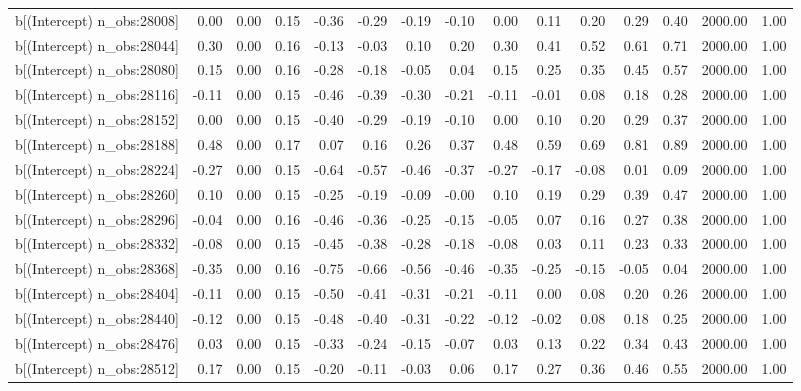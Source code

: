 \begin{table}[ht]
\begin{tabular}{rrrrrrrrrrrrrrr}
  b[(Intercept) n\_obs:28008] & 0.00 & 0.00 & 0.15 & -0.36 & -0.29 & -0.19 & -0.10 & 0.00 & 0.11 & 0.20 & 0.29 & 0.40 & 2000.00 & 1.00 \\ 
  b[(Intercept) n\_obs:28044] & 0.30 & 0.00 & 0.16 & -0.13 & -0.03 & 0.10 & 0.20 & 0.30 & 0.41 & 0.52 & 0.61 & 0.71 & 2000.00 & 1.00 \\ 
  b[(Intercept) n\_obs:28080] & 0.15 & 0.00 & 0.16 & -0.28 & -0.18 & -0.05 & 0.04 & 0.15 & 0.25 & 0.35 & 0.45 & 0.57 & 2000.00 & 1.00 \\ 
  b[(Intercept) n\_obs:28116] & -0.11 & 0.00 & 0.15 & -0.46 & -0.39 & -0.30 & -0.21 & -0.11 & -0.01 & 0.08 & 0.18 & 0.28 & 2000.00 & 1.00 \\ 
  b[(Intercept) n\_obs:28152] & 0.00 & 0.00 & 0.15 & -0.40 & -0.29 & -0.19 & -0.10 & 0.00 & 0.10 & 0.20 & 0.29 & 0.37 & 2000.00 & 1.00 \\ 
  b[(Intercept) n\_obs:28188] & 0.48 & 0.00 & 0.17 & 0.07 & 0.16 & 0.26 & 0.37 & 0.48 & 0.59 & 0.69 & 0.81 & 0.89 & 2000.00 & 1.00 \\ 
  b[(Intercept) n\_obs:28224] & -0.27 & 0.00 & 0.15 & -0.64 & -0.57 & -0.46 & -0.37 & -0.27 & -0.17 & -0.08 & 0.01 & 0.09 & 2000.00 & 1.00 \\ 
  b[(Intercept) n\_obs:28260] & 0.10 & 0.00 & 0.15 & -0.25 & -0.19 & -0.09 & -0.00 & 0.10 & 0.19 & 0.29 & 0.39 & 0.47 & 2000.00 & 1.00 \\ 
  b[(Intercept) n\_obs:28296] & -0.04 & 0.00 & 0.16 & -0.46 & -0.36 & -0.25 & -0.15 & -0.05 & 0.07 & 0.16 & 0.27 & 0.38 & 2000.00 & 1.00 \\ 
  b[(Intercept) n\_obs:28332] & -0.08 & 0.00 & 0.15 & -0.45 & -0.38 & -0.28 & -0.18 & -0.08 & 0.03 & 0.11 & 0.23 & 0.33 & 2000.00 & 1.00 \\ 
  b[(Intercept) n\_obs:28368] & -0.35 & 0.00 & 0.16 & -0.75 & -0.66 & -0.56 & -0.46 & -0.35 & -0.25 & -0.15 & -0.05 & 0.04 & 2000.00 & 1.00 \\ 
  b[(Intercept) n\_obs:28404] & -0.11 & 0.00 & 0.15 & -0.50 & -0.41 & -0.31 & -0.21 & -0.11 & 0.00 & 0.08 & 0.20 & 0.26 & 2000.00 & 1.00 \\ 
  b[(Intercept) n\_obs:28440] & -0.12 & 0.00 & 0.15 & -0.48 & -0.40 & -0.31 & -0.22 & -0.12 & -0.02 & 0.08 & 0.18 & 0.25 & 2000.00 & 1.00 \\ 
  b[(Intercept) n\_obs:28476] & 0.03 & 0.00 & 0.15 & -0.33 & -0.24 & -0.15 & -0.07 & 0.03 & 0.13 & 0.22 & 0.34 & 0.43 & 2000.00 & 1.00 \\ 
  b[(Intercept) n\_obs:28512] & 0.17 & 0.00 & 0.15 & -0.20 & -0.11 & -0.03 & 0.06 & 0.17 & 0.27 & 0.36 & 0.46 & 0.55 & 2000.00 & 1.00 \\ 

\end{tabular}
\end{table}
